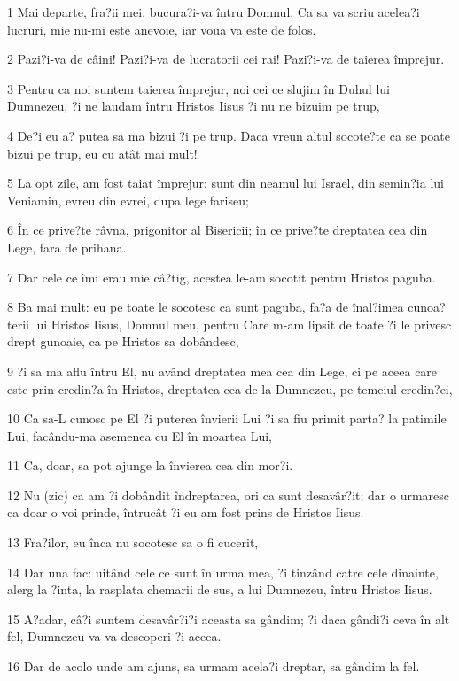 \par 1 Mai departe, fra?ii mei, bucura?i-va întru Domnul. Ca sa va scriu acelea?i lucruri, mie nu-mi este anevoie, iar voua va este de folos.
\par 2 Pazi?i-va de câini! Pazi?i-va de lucratorii cei rai! Pazi?i-va de taierea împrejur.
\par 3 Pentru ca noi suntem taierea împrejur, noi cei ce slujim în Duhul lui Dumnezeu, ?i ne laudam întru Hristos Iisus ?i nu ne bizuim pe trup,
\par 4 De?i eu a? putea sa ma bizui ?i pe trup. Daca vreun altul socote?te ca se poate bizui pe trup, eu cu atât mai mult!
\par 5 La opt zile, am fost taiat împrejur; sunt din neamul lui Israel, din semin?ia lui Veniamin, evreu din evrei, dupa lege fariseu;
\par 6 În ce prive?te râvna, prigonitor al Bisericii; în ce prive?te dreptatea cea din Lege, fara de prihana.
\par 7 Dar cele ce îmi erau mie câ?tig, acestea le-am socotit pentru Hristos paguba.
\par 8 Ba mai mult: eu pe toate le socotesc ca sunt paguba, fa?a de înal?imea cunoa?terii lui Hristos Iisus, Domnul meu, pentru Care m-am lipsit de toate ?i le privesc drept gunoaie, ca pe Hristos sa dobândesc,
\par 9 ?i sa ma aflu întru El, nu având dreptatea mea cea din Lege, ci pe aceea care este prin credin?a în Hristos, dreptatea cea de la Dumnezeu, pe temeiul credin?ei,
\par 10 Ca sa-L cunosc pe El ?i puterea învierii Lui ?i sa fiu primit parta? la patimile Lui, facându-ma asemenea cu El în moartea Lui,
\par 11 Ca, doar, sa pot ajunge la învierea cea din mor?i.
\par 12 Nu (zic) ca am ?i dobândit îndreptarea, ori ca sunt desavâr?it; dar o urmaresc ca doar o voi prinde, întrucât ?i eu am fost prins de Hristos Iisus.
\par 13 Fra?ilor, eu înca nu socotesc sa o fi cucerit,
\par 14 Dar una fac: uitând cele ce sunt în urma mea, ?i tinzând catre cele dinainte, alerg la ?inta, la rasplata chemarii de sus, a lui Dumnezeu, întru Hristos Iisus.
\par 15 A?adar, câ?i suntem desavâr?i?i aceasta sa gândim; ?i daca gândi?i ceva în alt fel, Dumnezeu va va descoperi ?i aceea.
\par 16 Dar de acolo unde am ajuns, sa urmam acela?i dreptar, sa gândim la fel.
